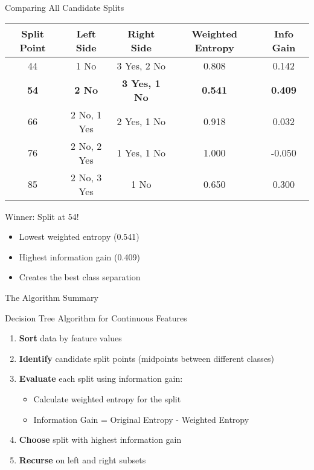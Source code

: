 \documentclass[usenames,dvipsnames]{beamer}
\begin{document}
\begin{frame}{Comparing All Candidate Splits}
    \scriptsize

\begin{table}[]
\centering
\begin{tabular}{@{}ccccc@{}}
\toprule
\textbf{Split Point} & \textbf{Left Side} & \textbf{Right Side} & \textbf{Weighted Entropy} & \textbf{Info Gain} \\ \midrule
44 & 1 No & 3 Yes, 2 No & 0.808 & 0.142 \\
\textbf{54} & \textbf{2 No} & \textbf{3 Yes, 1 No} & \textbf{0.541} & \textbf{0.409} \\
66 & 2 No, 1 Yes & 2 Yes, 1 No & 0.918 & 0.032 \\
76 & 2 No, 2 Yes & 1 Yes, 1 No & 1.000 & -0.050 \\
85 & 2 No, 3 Yes & 1 No & 0.650 & 0.300 \\ \bottomrule
\end{tabular}
\end{table}

\begin{keypointsbox}{Winner: Split at 54!}
\begin{itemize}
\item Lowest weighted entropy (0.541)
\item Highest information gain (0.409)
\item Creates the best class separation
\end{itemize}
\end{keypointsbox}
\end{frame}

\begin{frame}{The Algorithm Summary}
\begin{definitionbox}{Decision Tree Algorithm for Continuous Features}
\begin{enumerate}
\item \textbf{Sort} data by feature values
\item \textbf{Identify} candidate split points (midpoints between different classes)
\item \textbf{Evaluate} each split using information gain:
   \begin{itemize}
   \item Calculate weighted entropy for the split
   \item Information Gain = Original Entropy - Weighted Entropy
   \end{itemize}
\item \textbf{Choose} split with highest information gain
\item \textbf{Recurse} on left and right subsets
\end{enumerate}
\end{definitionbox}

\end{frame}
\end{document}
